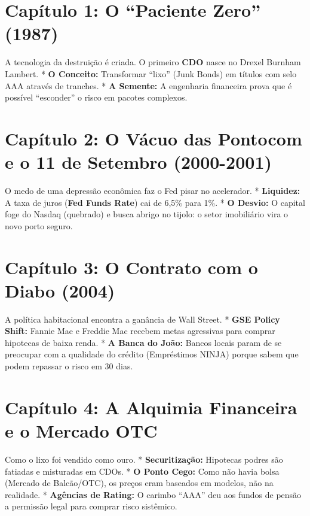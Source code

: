 \documentclass[
  portuguese,
  letterpaper,
  DIV=11,
  numbers=noendperiod,
  oneside]{scrartcl}
\begin{document}
\section{Capítulo 1: O ``Paciente Zero''
(1987)}\label{capuxedtulo-1-o-paciente-zero-1987}

A tecnologia da destruição é criada. O primeiro \textbf{CDO} nasce no
Drexel Burnham Lambert. * \textbf{O Conceito:} Transformar ``lixo''
(Junk Bonds) em títulos com selo AAA através de tranches. * \textbf{A
Semente:} A engenharia financeira prova que é possível ``esconder'' o
risco em pacotes complexos.

\section{Capítulo 2: O Vácuo das Pontocom e o 11 de Setembro
(2000-2001)}\label{capuxedtulo-2-o-vuxe1cuo-das-pontocom-e-o-11-de-setembro-2000-2001}

O medo de uma depressão econômica faz o Fed pisar no acelerador. *
\textbf{Liquidez:} A taxa de juros (\textbf{Fed Funds Rate}) cai de
6,5\% para 1\%. * \textbf{O Desvio:} O capital foge do Nasdaq (quebrado)
e busca abrigo no tijolo: o setor imobiliário vira o novo porto seguro.

\section{Capítulo 3: O Contrato com o Diabo
(2004)}\label{capuxedtulo-3-o-contrato-com-o-diabo-2004}

A política habitacional encontra a ganância de Wall Street. *
\textbf{GSE Policy Shift:} Fannie Mae e Freddie Mac recebem metas
agressivas para comprar hipotecas de baixa renda. * \textbf{A Banca do
João:} Bancos locais param de se preocupar com a qualidade do crédito
(Empréstimos NINJA) porque sabem que podem repassar o risco em 30 dias.

\section{Capítulo 4: A Alquimia Financeira e o Mercado
OTC}\label{capuxedtulo-4-a-alquimia-financeira-e-o-mercado-otc}

Como o lixo foi vendido como ouro. * \textbf{Securitização:} Hipotecas
podres são fatiadas e misturadas em CDOs. * \textbf{O Ponto Cego:} Como
não havia bolsa (Mercado de Balcão/OTC), os preços eram baseados em
modelos, não na realidade. * \textbf{Agências de Rating:} O carimbo
``AAA'' deu aos fundos de pensão a permissão legal para comprar risco
sistêmico.
\end{document}
